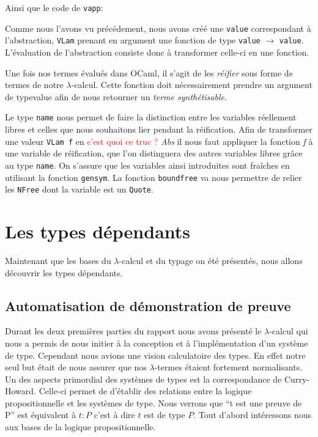 \documentclass {article}
\newcommand{\codefrom}[3]
           {}
\theoremstyle{definition}
\theoremstyle{remark}
\newcommand{\todo}[1]{\textcolor{red}{#1}}
\newcommand{\fun}[1]{\lstinline!#1!}
\begin{document}
\codefrom{typed}{lambda}{big_step_eval_exTm_app}
Ainsi que le code de \fun{vapp}: 
\codefrom{typed}{lambda}{vapp}

Comme nous l'avons vu précédement, nous avons créé une \fun{value} correspondant
à l'abstraction, \fun{VLam} prenant en argument une fonction de type \fun{value} $\rightarrow$ \fun{value}.
L'évaluation de l'abstraction consiste donc à transformer celle-ci en une fonction.
\codefrom{typed}{lambda}{big_step_eval_inTm_abs} 

Une fois nos termes évalués dans OCaml, il s'agit de les
\emph{réifier} sous forme de termes de notre
$\lambda$-calcul. Cette fonction doit nécessairement prendre un argument de
type{value} afin de nous retourner un \emph{terme synthétisable}.

\codefrom{typed}{lambda}{value_to_inTm}
\codefrom{typed}{lambda}{neutral_to_exTm}



Le type \fun{name} nous permet de faire la distinction entre les
variables réellement libres et celles que nous souhaitons lier pendant la réification.
Afin de transformer une valeur \lstinline!VLam f! en
\todo{c'est quoi ce truc ?} \emph{Abs} il nous faut appliquer la fonction \emph{f} à une variable
de réification, que l'on distinguera des autres variables libres grâce au type \fun{name}.
On s'assure que les variables ainsi introduites sont fraîches en utilisant la fonction \fun{gensym}.
La fonction \fun{boundfree} va nous permettre de relier les \fun{NFree} dont la variable est un \fun{Quote}.
\codefrom{typed}{lambda}{boundfree}



\section{Les types dépendants}

Maintenant que les bases du $\lambda$-calcul et du typage on été présentés,
nous allons découvrir les types dépendants. 
 
\subsection{Automatisation de démonstration de preuve}
Durant les deux premières parties du rapport nous avons présenté le $\lambda$-calcul
qui nous a permis de nous initier à la conception et à l'implémentation d'un système de type. Cependant nous avions une vision 
calculatoire des types. En effet notre seul but était de nous assurer que nos $\lambda$-termes
étaient fortement normalisants. 
Un des aspects primordial des systèmes de types est la correspondance de Curry-Howard.
Celle-ci permet de d'établir des relations entre la logique propositionnelle et les systèmes 
de type. Nous verrons que ``t est une preuve de P'' est équivalent à  $t:P$ c'est à dire  $t$ est de type $P$.
Tout d'abord intéressons nous aux bases de la logique propositionnelle.
\end{document}
